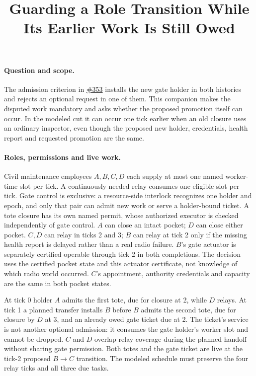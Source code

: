 \documentclass[11pt]{article}
\title{Guarding a Role Transition While Its Earlier Work Is Still Owed}
\date{}
\begin{document}
\maketitle

\paragraph{Question and scope.}
The admission criterion in \href{https://github.com/eternal-november/eos-research-programmes/pull/353}{\#353} installs the new gate holder in both histories and rejects an optional request in one of them. This companion makes the disputed work mandatory and asks whether the proposed promotion itself can occur. In the modeled cut it can occur one tick earlier when an old closure uses an ordinary inspector, even though the proposed new holder, credentials, health report and requested promotion are the same.

\paragraph{Roles, permissions and live work.}
Civil maintenance employees $A,B,C,D$ each supply at most one named worker-time slot per tick. A continuously needed relay consumes one eligible slot per tick. Gate control is exclusive: a resource-side interlock recognizes one holder and epoch, and only that pair can admit new work or serve a holder-bound ticket. A tote closure has its own named permit, whose authorized executor is checked independently of gate control. $A$ can close an intact pocket; $D$ can close either pocket. $C,D$ can relay in ticks 2 and 3; $B$ can relay at tick 2 only if the missing health report is delayed rather than a real radio failure. $B$'s gate actuator is separately certified operable through tick 2 in both completions. The decision uses the certified pocket state and this actuator certificate, not knowledge of which radio world occurred. $C$'s appointment, authority credentials and capacity are the same in both pocket states.

At tick 0 holder $A$ admits the first tote, due for closure at 2, while $D$ relays. At tick 1 a planned transfer installs $B$ before $B$ admits the second tote, due for closure by $D$ at 3, and an already owed gate ticket due at 2. The ticket's service is not another optional admission: it consumes the gate holder's worker slot and cannot be dropped. $C$ and $D$ overlap relay coverage during the planned handoff without sharing gate permission. Both totes and the gate ticket are live at the tick-2 proposed $B\to C$ transition. The modeled schedule must preserve the four relay ticks and all three due tasks.
\end{document}
